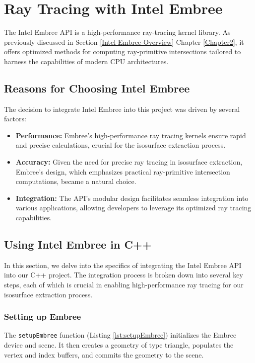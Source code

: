 \section{Ray Tracing with Intel Embree}

The Intel Embree API is a high-performance ray-tracing kernel library. As previously discussed in Section \ref{Intel-Embree-Overview} Chapter \ref{Chapter2}, it offers optimized methods for computing ray-primitive intersections tailored to harness the capabilities of modern CPU architectures.

\subsection{Reasons for Choosing Intel Embree}
The decision to integrate Intel Embree into this project was driven by several factors:
\begin{itemize}
    \item \textbf{Performance:} Embree's high-performance ray tracing kernels ensure rapid and precise calculations, crucial for the isosurface extraction process.
    \item \textbf{Accuracy:} Given the need for precise ray tracing in isosurface extraction, Embree's design, which emphasizes practical ray-primitive intersection computations, became a natural choice.
    \item \textbf{Integration:} The API's modular design facilitates seamless integration into various applications, allowing developers to leverage its optimized ray tracing capabilities.
\end{itemize}

\subsection{Using Intel Embree in C++}
In this section, we delve into the specifics of integrating the Intel Embree API into our C++ project. The integration process is broken down into several key steps, each of which is crucial in enabling high-performance ray tracing for our isosurface extraction process.

\subsubsection{Setting up Embree} 
The \texttt{setupEmbree} function (Listing \ref{lst:setupEmbree}) initializes the Embree device and scene. It then creates a geometry of type triangle, populates the vertex and index buffers, and commits the geometry to the scene.

